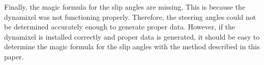 Finally, the magic formula for the slip angles are missing. This is because the dynamixel was not functioning properly. Therefore, the steering angles could not be determined accurately enough to generate proper data. However, if the dynamixel is installed correctly and proper data is generated, it should be easy to determine the magic formula for the slip angles with the method described in this paper.

